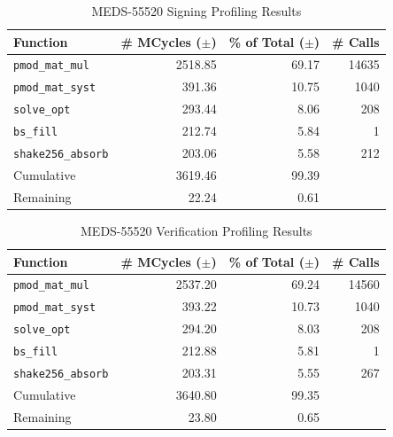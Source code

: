 \documentclass[11pt,a4paper]{report}
\theoremstyle{definition}
\begin{document}
\begin{table}[]
  \centering
  \begin{tabular}{lrrr}
    \toprule
    \textbf{Function} & \textbf{\# MCycles} ($\pm$) & \textbf{\% of Total} ($\pm$) & \textbf{\# Calls} \\
    \midrule
      \texttt{pmod\_mat\_mul} & 2518.85 & 69.17 & 14635 \\
      \texttt{pmod\_mat\_syst} & 391.36 & 10.75 & 1040 \\
      \texttt{solve\_opt} & 293.44 & 8.06 & 208 \\
      \texttt{bs\_fill} & 212.74 & 5.84 & 1 \\
      \texttt{shake256\_absorb} & 203.06 & 5.58 & 212 \\
    \midrule
      Cumulative & 3619.46 & 99.39 & \\
      Remaining & 22.24 & 0.61 & \\
    \bottomrule
  \end{tabular}
  \caption{MEDS-55520 Signing Profiling Results}
  \label{tab:medssigningfunctions}
\end{table}

\begin{table}[]
  \centering
  \begin{tabular}{lrrr}
    \toprule
    \textbf{Function} & \textbf{\# MCycles} ($\pm$) & \textbf{\% of Total} ($\pm$) & \textbf{\# Calls} \\
    \midrule
      \texttt{pmod\_mat\_mul} & 2537.20 & 69.24 & 14560 \\
      \texttt{pmod\_mat\_syst} & 393.22 & 10.73 & 1040 \\
      \texttt{solve\_opt} & 294.20 & 8.03 & 208 \\
      \texttt{bs\_fill} & 212.88 & 5.81 & 1 \\
      \texttt{shake256\_absorb} & 203.31 & 5.55 & 267 \\
    \midrule
      Cumulative & 3640.80 & 99.35 & \\
      Remaining & 23.80 & 0.65 & \\
    \bottomrule
  \end{tabular}
  \caption{MEDS-55520 Verification Profiling Results}
  \label{tab:medsverificationfunctions}
\end{table}

\end{document}
